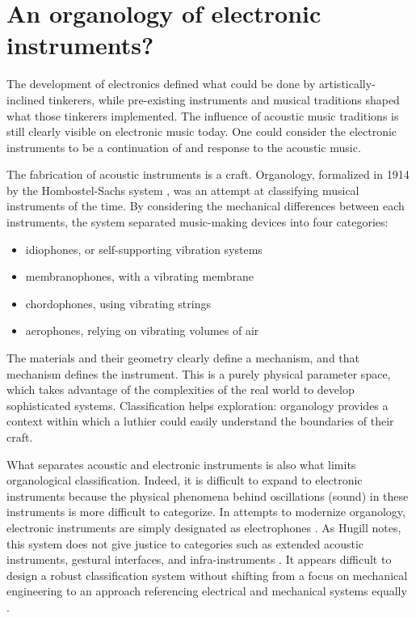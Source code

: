 \section{An organology of electronic instruments?}  

The development of electronics defined what could be done by artistically-inclined tinkerers, while pre-existing instruments and musical traditions shaped what those tinkerers implemented. The influence of acoustic music traditions is still clearly visible on electronic music today. One could consider the electronic instruments to be a continuation of and response to the acoustic music. 

The fabrication of acoustic instruments is a craft. Organology, formalized in 1914 by the Hombostel-Sachs system \citep{von1961}, was an attempt at classifying musical instruments of the time. By considering the mechanical differences between each instruments, the system separated music-making devices into four categories: 

\begin{itemize}
	\item idiophones, or self-supporting vibration systems
	\item membranophones, with a vibrating membrane
	\item chordophones, using vibrating strings
	\item aerophones, relying on vibrating volumes of air
\end{itemize}

The materials and their geometry clearly define a mechanism, and that mechanism defines the instrument. This is a purely physical parameter space, which takes advantage of the complexities of the real world to develop sophisticated systems. Classification helps exploration: organology provides a context within which a luthier could easily understand the boundaries of their craft. 

What separates acoustic and electronic instruments is also what limits organological classification. Indeed, it is difficult to expand to electronic instruments because the physical phenomena behind oscillations (sound) in these instruments is more difficult to categorize. In attempts to modernize organology, electronic instruments are simply designated as electrophones \citep{hugill2012}. As Hugill notes, this system does not give justice to categories such as extended acoustic instruments, gestural interfaces, and infra-instruments \citep{bowers2005}. It appears difficult to design a robust classification system without shifting from a focus on mechanical engineering to an approach referencing electrical and mechanical systems equally \citep{haslett2005}. 

